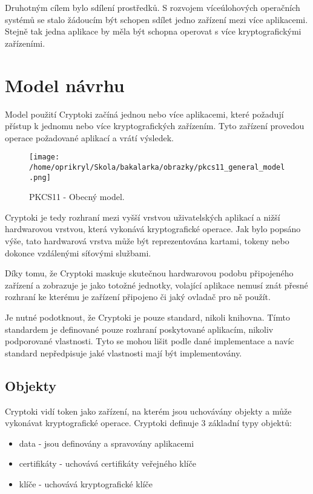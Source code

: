 \documentclass[]{fithesis3}
\begin{document}
	Druhotným cílem bylo sdílení prostředků. S rozvojem víceúlohových operačních systémů se 		stalo žádoucím být schopen sdílet jedno zařízení mezi více aplikacemi. Stejně tak jedna 			aplikace by měla být schopna operovat s více kryptografickými zařízeními.

	\section{Model návrhu}

	Model použití Cryptoki začíná jednou nebo více aplikacemi, které požadují přístup k jednomu 		nebo více kryptografických zařízením. Tyto zařízení provedou operace požadované aplikací a 		vrátí výsledek.
	\begin{figure}[!ht]
  		\begin{minipage}{1.00\textwidth}
    			\texttt{[image: /home/oprikryl/Skola/bakalarka/obrazky/pkcs11\_general\_model.png]}
  		\end{minipage}
 		\caption{PKCS11 - Obecný model.}
  		\label{fig:PKCS11 - Obecný model.}
	\end{figure}

	Cryptoki je tedy rozhraní mezi vyšší vrstvou uživatelských aplikací a nižší hardwarovou 			vrstvou, která vykonává kryptografické operace. Jak bylo popsáno výše, tato hardwarová 			vrstva může být reprezentována kartami, tokeny nebo dokonce vzdálenými síťovými službami.

	Díky tomu, že Cryptoki maskuje skutečnou hardwarovou podobu připojeného zařízení a 			zobrazuje je jako totožné jednotky, volající aplikace nemusí znát přesné rozhraní ke kterému je 		zařízení připojeno či jaký ovladač pro ně použít.

	Je nutné podotknout, že Cryptoki je pouze standard, nikoli knihovna. Tímto standardem je 			definované pouze rozhraní poskytované aplikacím, nikoliv podporované vlastnosti. Tyto se 			mohou lišit podle dané implementace a navíc standard nepředpisuje jaké vlastnosti mají být 			implementovány.

		\subsection{Objekty}

		Cryptoki vidí token jako zařízení, na kterém jsou uchovávány objekty a může vykonávat 			kryptografické operace. Cryptoki definuje 3 základní typy objektů:
		\begin{itemize}
			\item data - jsou definovány a spravovány aplikacemi
			\item certifikáty - uchovává certifikáty veřejného klíče
			\item klíče - uchovává kryptografické klíče
		\end{itemize}
\end{document}
